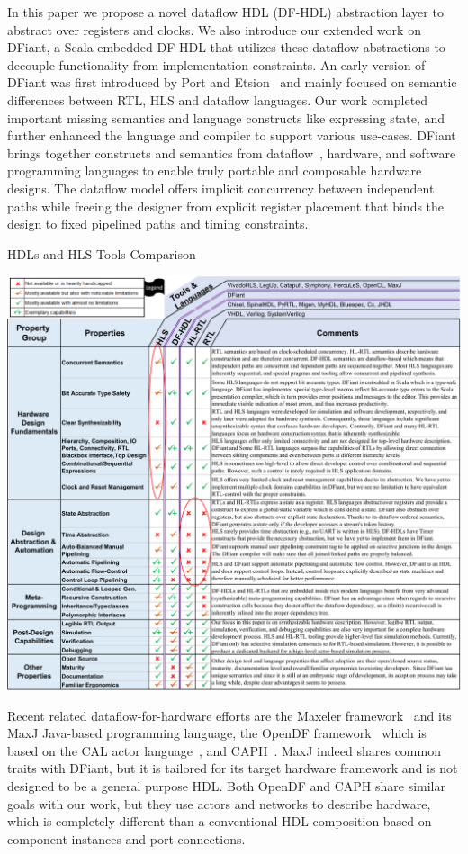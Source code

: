 In this paper we propose a novel dataflow HDL (DF-HDL) abstraction layer to abstract over registers and clocks. We also introduce our extended work on DFiant, a Scala-embedded DF-HDL that utilizes these dataflow abstractions to decouple functionality from implementation constraints. An early version of DFiant was first introduced by Port and Etsion~\cite{Port2017} and mainly focused on semantic differences between RTL, HLS and dataflow languages. Our work completed important missing semantics and language constructs like expressing state, and further enhanced the language and compiler to support various use-cases. DFiant brings together constructs and semantics from dataflow~\cite{le1986signal, Thuau1991, gurd1985manchester, arvind1992id}, hardware, and software programming languages to enable truly portable and composable hardware designs. The dataflow model offers implicit concurrency between independent paths while freeing the designer from explicit register placement that binds the design to fixed pipelined paths and timing constraints.

\begin{table}[t]
	\centering
	\captionsetup{justification=centering}
	\caption{HDLs and HLS Tools Comparison}
	\includegraphics[width=\linewidth]{graphics/HDLs-cropped.pdf} 
	\label{tbl:comparison}
\end{table}

Recent related dataflow-for-hardware efforts are the Maxeler framework~\cite{Pell2011} and its MaxJ Java-based programming language, the OpenDF framework~\cite{bhattacharyya2008opendf} which is based on the CAL actor language~\cite{eker2003cal}, and CAPH~\cite{serot2011implementing}. MaxJ indeed shares common traits with DFiant, but it is tailored for its target hardware framework and is not designed to be a general purpose HDL. Both OpenDF and CAPH share similar goals with our work, but they use actors and networks to describe hardware, which is completely different than a conventional HDL composition based on component instances and port connections.

